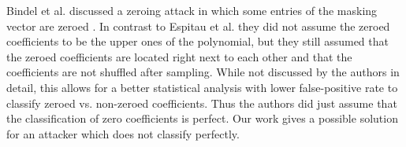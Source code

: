 Bindel et al. discussed a zeroing attack in which some entries of the masking vector are zeroed  \cite[pp.~72--73]{sensitivity}.
In contrast to Espitau et al. \cite{espitau} they did not assume the zeroed coefficients to be the upper ones of the polynomial, but they still assumed that the zeroed coefficients are located right next to each other and that the coefficients are not shuffled after sampling.
While not discussed by the authors in detail, this allows for a better statistical analysis with lower false-positive rate to classify zeroed vs. non-zeroed coefficients.
Thus the authors did just assume that the classification of zero coefficients is perfect. Our work gives a possible solution for an attacker which does not classify perfectly.

